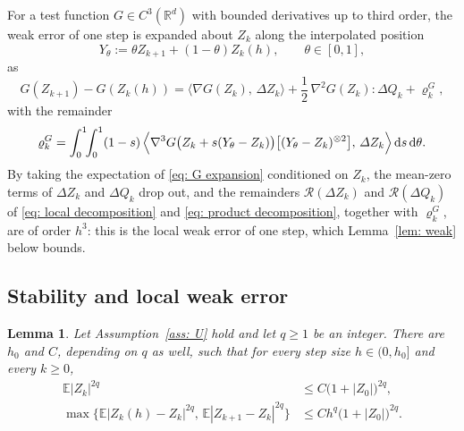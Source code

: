 \documentclass[namedate,webpdf,imanum]{ima-authoring-template}
\newcommand{\Le}{\leqslant}
\newcommand{\Ge}{\geqslant}
\newcommand{\D}{\mathrm{d}}
\theoremstyle{thmstyletwo}
\newtheorem{lemma}{Lemma}
\numberwithin{equation}{section}
\begin{document}
For a test function $G \in C^3(\mathbb R^d)$ with bounded derivatives up to third order, the weak error of one step is expanded about $Z_k$ along the interpolated position
\begin{equation}
    Y_\theta := \theta Z_{k+1} + (1-\theta) Z_k(h) , \qquad \theta \in [0,1] ,
    \label{eq: interpolated position}
\end{equation}
as
\begin{equation}
    G(Z_{k+1}) - G(Z_k(h))
    = \bigl\langle \nabla G(Z_k),\, \Delta Z_k \bigr\rangle
    + \frac12\, \nabla^2 G(Z_k) : \Delta Q_k + \varrho_k^G ,
    \label{eq: G expansion}
\end{equation}
with the remainder
\begin{equation}
    \varrho_k^G = \int_0^1 \!\! \int_0^1 (1-s)\, \Bigl\langle \nabla^3 G\bigl( Z_k + s (Y_\theta - Z_k) \bigr) \bigl[ (Y_\theta - Z_k)^{\otimes 2} \bigr] ,\, \Delta Z_k \Bigr\rangle \,\D s\,\D\theta .
    \label{eq: G remainder integral}
\end{equation}
By taking the expectation of \eqref{eq: G expansion} conditioned on $Z_k$, the mean-zero terms of $\Delta Z_k$ and $\Delta Q_k$ drop out, and the remainders $\mathcal R(\Delta Z_k)$ and $\mathcal R(\Delta Q_k)$ of \eqref{eq: local decomposition} and \eqref{eq: product decomposition}, together with $\varrho_k^G$, are of order $h^3$: this is the local weak error of one step, which Lemma~\ref{lem: weak} below bounds.

\subsection{Stability and local weak error}
\label{subsec: chain}

\begin{lemma}
\label{lem: moments}
    Let Assumption~\ref{ass: U} hold and let $q \Ge 1$ be an integer. There are $h_0$ and $C$, depending on $q$ as well, such that for every step size $h \in (0, h_0]$ and every $k \Ge 0$,
    \begin{equation}
    \begin{aligned}
        \mathbb E |Z_k|^{2q} &\Le C \bigl( 1 + |Z_0| \bigr)^{2q} , \\
        \max\bigl\{ \mathbb E |Z_k(h) - Z_k|^{2q} ,\, \mathbb E |Z_{k+1} - Z_k|^{2q} \bigr\}
        &\Le C h^{q} \bigl( 1 + |Z_0| \bigr)^{2q} .
    \end{aligned}
        \label{eq: moment bounds}
    \end{equation}
\end{lemma}
\end{document}
